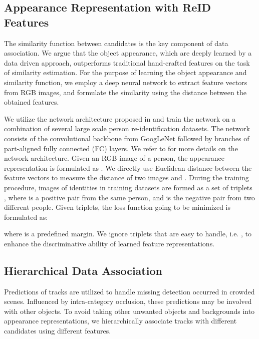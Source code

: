 \documentclass{article}
\begin{document}
\subsection{Appearance Representation with ReID Features}
\label{sec:reid}

The similarity function between candidates is the key component of data association. 
We argue that the object appearance, which are deeply learned by a data driven approach,
outperforms traditional hand-crafted features on the task of similarity estimation.
For the purpose of learning the object appearance and similarity function, 
we employ a deep neural network to extract feature vectors from RGB images,
and formulate the similarity using the distance between the obtained features. 


We utilize the network architecture proposed in \cite{zhao2017deeply}
and train the network on a combination of several large scale person re-identification datasets.
The network  consists of the convolutional backbone from GoogLeNet \cite{szegedy2015going} followed by  branches of part-aligned fully connected (FC) layers.
We refer to \cite{zhao2017deeply} for more details on the network architecture.
Given an RGB image  of a person,
the appearance representation is formulated as .
We directly use Euclidean distance between the feature vectors to measure the distance  of two images  and .
During the training procedure, images of identities in training datasets 
are formed as a set of triplets ,
where  is a positive pair from the same person,
and  is the negative pair from two different people.
Given  triplets, the loss function going to be minimized is formulated as:

where  is a predefined margin.
We ignore triplets that are easy to handle, i.e. , 
to enhance the discriminative ability of learned feature representations.

\subsection{Hierarchical Data Association}
\label{sec:associate}
Predictions of tracks are utilized to handle missing detection occurred in crowded scenes.
Influenced by intra-category occlusion,
these predictions may be involved with other objects. 
To avoid taking other unwanted objects and backgrounds into appearance representations,
we hierarchically associate tracks with different candidates using different features.
\end{document}
